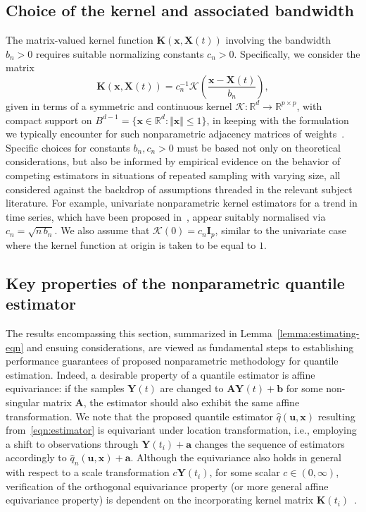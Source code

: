 \documentclass[aos]{imsart}
\theoremstyle{plain}
\theoremstyle{remark}
\def\R{\mathbb{R}}
\newcommand{\Kcal}{\mathcal{K}}
\newcommand{\bb}[1]{\boldsymbol{#1}}
\newcommand{\kernel}[1]{\bb{K}(\bb{x}, \bb{X}(#1))}
\begin{document}
\subsection{Choice of the kernel and associated bandwidth}\label{sec:bandwidth-choice}

The matrix-valued kernel function $\kernel{t}$ involving the bandwidth $b_n>0$ requires suitable normalizing constants $c_n>0$. Specifically, we consider the matrix
\begin{equation*}
    \kernel{t} = c_n^{-1} \Kcal\left( \dfrac{\bb{x} - \bb{X}(t)}{b_n} \right),
\end{equation*}
given in terms of a symmetric and continuous kernel $\Kcal: \R^d \rightarrow \R^{p\times p}$, with compact support on $B^{d-1} = \{ \bb{x} \in \R^d : \Vert \bb{x}\Vert \leqslant 1\}$, in keeping with the formulation we typically encounter for such nonparametric adjacency matrices of weights~\citep[see e.g.][]{deb2021nonparametric,zhao2008confidence}. Specific choices for constants $b_n, c_n >0$ must be based not only on theoretical considerations, but also be informed by empirical evidence on the behavior of competing estimators in situations of repeated sampling with varying size, all considered against the backdrop of assumptions threaded in the relevant subject literature. For example, univariate nonparametric kernel estimators for a trend in time series, which have been proposed in~\cite{zhao2008confidence}, appear suitably normalised via $c_n = \sqrt{n\,b_n}$. We also assume that $\Kcal(0) = c_n\bb{I}_p$, similar to the univariate case where the kernel function at origin is taken to be equal to $1$.


\subsection{Key properties of the nonparametric quantile estimator}
The results encompassing this section, summarized in Lemma~\ref{lemma:estimating-eqn} and ensuing considerations, are viewed as fundamental steps to establishing performance guarantees of proposed nonparametric methodology for quantile estimation. Indeed, a desirable property of a quantile estimator is affine equivariance: if the samples $\bb{Y}(t)$ are changed to $\bb{A}\bb{Y}(t) + \bb{b}$ for some non-singular matrix $\bb{A}$, the estimator should also exhibit the same affine transformation. We note that the proposed quantile estimator $\hat{q}(\bb{u} ,\bb{x})$ resulting from~\eqref{eqn:estimator} is equivariant under location transformation, i.e., employing a shift to observations through $\bb{Y}(t_i) + \bb{a}$ changes the sequence of estimators accordingly to $\hat{q}_n(\bb{u} ,\bb{x}) + \bb{a}$. Although the equivariance also holds in general with respect to a scale transformation $c\bb{Y}(t_i)$, for some scalar $c \in (0, \infty)$, verification of the orthogonal equivariance property (or more general affine equivariance property) is dependent on the incorporating kernel matrix $\bb{K}(t_i)$~\citep[see][]{chaudhuri1996geometric,Chen1996,KonenPaindaveine22}.
\end{document}

